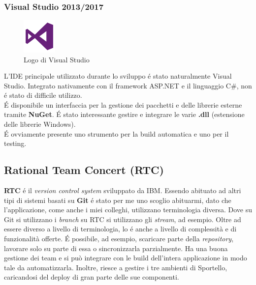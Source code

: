 \subsubsection{Visual Studio 2013/2017}
\begin{figure}
    \begin{center}
        \includegraphics[width=0.15\textwidth]{./res/img/visual-studio-2013-logo.png}
        \caption{Logo di Visual Studio}
    \end{center}
\end{figure}

L'IDE principale utilizzato durante lo sviluppo é stato naturalmente Visual Studio. Integrato nativamente con il framework ASP.NET e il linguaggio C\#, non é stato di difficile utilizzo. \\ É disponibile un interfaccia per la gestione dei pacchetti e delle librerie esterne tramite \textbf{NuGet}. É stato interessante gestire e integrare le varie \textbf{.dll} (estensione delle librerie Windows). \\ É ovviamente presente uno strumento per la build automatica e uno per il testing.

\subsection{Rational Team Concert (RTC)}
\textbf{RTC} é il \textit{version control system} sviluppato da IBM. Essendo abituato ad altri tipi di sistemi basati su \textbf{Git} é stato per me uno scoglio abituarmi, dato che l'applicazione, come anche i miei colleghi, utilizzano terminologia diversa. Dove su Git si utilizzano i \textit{branch} su RTC si utilizzano gli \textit{stream}, ad esempio. Oltre ad essere diverso a livello di terminologia, lo é anche a livello di complessità e di funzionalità offerte. É possibile, ad esempio, scaricare parte della \textit{repository}, lavorare solo su parte di essa o sincronizzarla parzialmente. Ha una buona gestione dei team e si può integrare con le build dell'intera applicazione in modo tale da automatizzarla. Inoltre, riesce a gestire i tre ambienti di Sportello, caricandosi del deploy di gran parte delle sue componenti. 